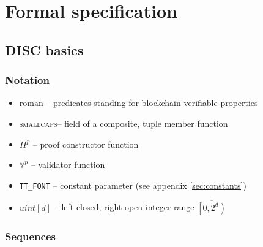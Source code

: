 \section{Formal specification}\label{sec:formal}

\subsection{DISC basics}\label{sec:appendix-disc}
\subsubsection{Notation}

\begin{itemize}[noitemsep]
    \item  $\mathrm{roman}$ -- predicates standing for blockchain verifiable properties 
    \item \textsc{smallcaps}-- field of a composite, tuple member function
    \item $\Pi^p$ -- proof constructor function
    \item $\mathbb{V}^p$ -- validator function
    \item \texttt{TT\_FONT} -- constant parameter (see appendix \ref{sec:constants})
    \item $\mathit{uint}[d]$ -- left closed, right open integer range $\overline{\left[0,2^d\right)}$
\end{itemize}


\subsubsection{Sequences}
 
